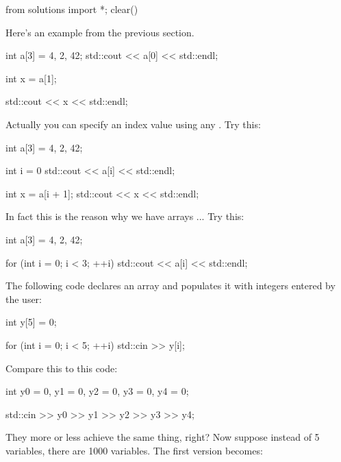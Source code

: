 \begin{python0}
from solutions import *; clear()
\end{python0}

Here's an example from the previous section.

\begin{consolethree}[escapeinside=||]
int a[3] = {4, 2, 42};
std::cout << a[0] << std::endl;

int x = a[1];

std::cout << x << std::endl;  
\end{consolethree}

Actually you can specify an index value using any . Try this:

\begin{consolethree}[escapeinside=||]
int a[3] = {4, 2, 42};

int i = 0
std::cout << a[i] << std::endl;

int x = a[i + 1];
std::cout << x << std::endl;  
\end{consolethree}

In fact this is the reason why we have arrays ... Try this:

\begin{consolethree}[escapeinside=||]
int a[3] = {4, 2, 42};

for (int i = 0; i < 3; ++i)
{
    std::cout << a[i] << std::endl;
}
\end{consolethree}

The following code declares an array and populates it with integers entered by the user:

\begin{consolethree}[escapeinside=||]
int y[5] = {0};

for (int i = 0; i < 5; ++i)
{
    std::cin >> y[i];
} 
\end{consolethree}

Compare this to this code:

\begin{consolethree}[escapeinside=||]
int y0 = 0, y1 = 0, y2 = 0, y3 = 0, y4 = 0;

std::cin >> y0 >> y1 >> y2 >> y3 >> y4; 
\end{consolethree}

They more or less achieve the same thing, right? Now suppose instead of 5 variables, there are 1000 variables. The first version becomes:

